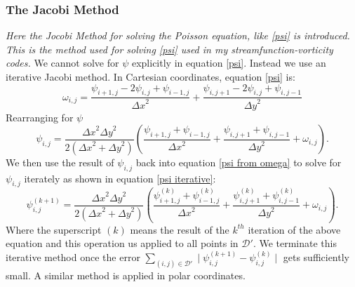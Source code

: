 \documentclass{article}
\begin{document}
\subsubsection*{The Jacobi Method}
{\it{Here the Jocobi Method for solving the Poisson equation, like \ref{psi} is introduced. This is the method used for solving \ref{psi} used in my streamfunction-vorticity codes.}}
\vspace{0.3cm}
\newline
We cannot solve for $\psi$ explicitly in equation \ref{psi}. Instead we use an iterative Jacobi method. In Cartesian coordinates, equation \ref{psi} is:
\begin{equation}
	\omega_{i,j} = \frac{\psi_{i+1,j} - 2 \psi_{i,j} + \psi_{i-1,j}  }{{\Delta x}^2} + \frac{\psi_{i,j+1} - 2 \psi_{i,j} + \psi_{i,j-1}  }{{\Delta y}^2}
	\label{psi disc}
\end{equation}
Rearranging for $\psi$
\begin{equation}
	\psi_{i,j} = \frac{{\Delta x}^2 {\Delta y}^2  }{2({\Delta x}^2  + {\Delta y}^2)} (\frac{\psi_{i+1,j} +\psi_{i-1,j} }{{\Delta x}^2} + \frac{\psi_{i,j+1} +\psi_{i,j-1}  }{{\Delta y}^2 }  + \omega_{i,j}).
	\label{psi from omega}
\end{equation}
We then use the result of $\psi_{i,j}$ back into equation \ref{psi from omega} to solve for $\psi_{i,j}$ iterately as shown in equation \ref{psi iterative}:
\begin{equation}
	\psi_{i,j}^{(k+1)} = \frac{{\Delta x}^2 {\Delta y}^2  }{2({\Delta x}^2  + {\Delta y}^2)} (\frac{\psi_{i+1,j}^{(k)} +\psi_{i-1,j}^{(k)}  }{{\Delta x}^2} + \frac{\psi_{i,j+1}^{(k)} +\psi_{i,j-1}^{(k)}  }{{\Delta y}^2 } + \omega_{i,j}).
	\label{psi iterative}
\end{equation}
Where the superscript $(k)$ means the result of the $k^{th}$ iteration of the above equation and this operation us applied to all points in $\mathcal{D}'$.
 We terminate this iterative method once the error $\sum_{(i,j) \in \mathcal{D'}} \mid \psi_{i,j}^{(k+1)} - \psi_{i,j}^{(k)} \mid$ gets sufficiently small. A similar method is applied in polar coordinates. 
\end{document}
